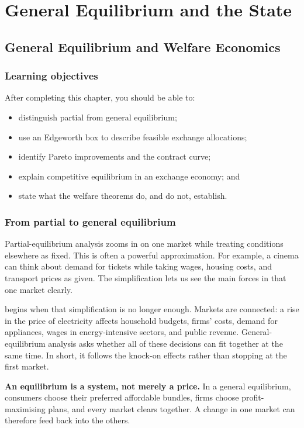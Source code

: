\part{General Equilibrium and the State}

\chapter{General Equilibrium and Welfare Economics}
\label{chap:general-equilibrium}

\section{Learning objectives}

After completing this chapter, you should be able to:
\begin{itemize}
  \item distinguish partial from general equilibrium;
  \item use an Edgeworth box to describe feasible exchange allocations;
  \item identify Pareto improvements and the contract curve;
  \item explain competitive equilibrium in an exchange economy; and
  \item state what the welfare theorems do, and do not, establish.
\end{itemize}

\section{From partial to general equilibrium}

Partial-equilibrium analysis zooms in on one market while treating conditions
elsewhere as fixed. This is often a powerful approximation. For example, a
cinema can think about demand for tickets while taking wages, housing costs,
and transport prices as given. The simplification lets us see the main forces
in that one market clearly.

 begins when that simplification is no longer
enough. Markets are connected: a rise in the price of electricity affects
household budgets, firms' costs, demand for appliances, wages in
energy-intensive sectors, and public revenue. General-equilibrium analysis
asks whether all of these decisions can fit together at the same time. In
short, it follows the knock-on effects rather than stopping at the first
market.

\begin{keyidea}
\textbf{An equilibrium is a system, not merely a price.}
In a general equilibrium, consumers choose their preferred affordable bundles,
firms choose profit-maximising plans, and every market clears together. A
change in one market can therefore feed back into the others.
\end{keyidea}

